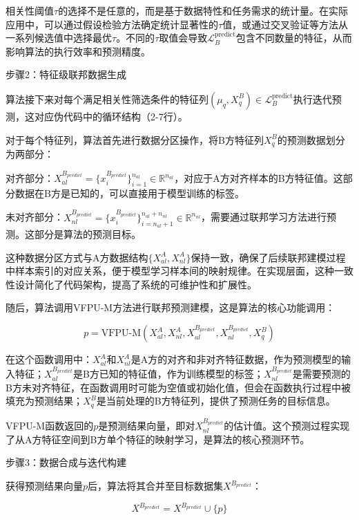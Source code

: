 相关性阈值$\tau$的选择不是任意的，而是基于数据特性和任务需求的统计量。在实际应用中，可以通过假设检验方法确定统计显著性的$\tau$值，或通过交叉验证等方法从一系列候选值中选择最优$\tau$。不同的$\tau$取值会导致$\mathcal{L}_B^{\text{predict}}$包含不同数量的特征，从而影响算法的执行效率和预测精度。

步骤2：特征级联邦数据生成

算法接下来对每个满足相关性筛选条件的特征列$(\mu_q, X^B_q) \in \mathcal{L}_B^{\text{predict}}$执行迭代预测，这对应伪代码中的循环结构（2-7行）。

对于每个特征列，算法首先进行数据分区操作，将B方特征列$X^B_q$的预测数据划分为两部分：

对齐部分：$X_{al}^{B_{predict}} = \{x_{i}^{B_{predict}}\}_{i=1}^{n_{al}} \in \mathbb{R}^{n_{al}}$，对应于A方对齐样本的B方特征值。这部分数据在B方是已知的，可以直接用于模型训练的标签。

未对齐部分：$X_{nl}^{B_{predict}} = \{x_{i}^{B_{predict}}\}_{i=n_{al}+1}^{n_{al}+n_{nl}} \in \mathbb{R}^{n_{nl}}$，需要通过联邦学习方法进行预测。这部分是算法的预测目标。

这种数据分区方式与A方数据结构$\{X_{al}^A, X_{nl}^A\}$保持一致，确保了后续联邦建模过程中样本索引的对应关系，便于模型学习样本间的映射规律。在实现层面，这种一致性设计简化了代码架构，提高了系统的可维护性和扩展性。

随后，算法调用VFPU-M方法进行联邦预测建模，这是算法的核心功能调用：

\begin{equation}
	p = \text{VFPU-M}(X_{al}^A, X_{nl}^A, X_{al}^{B_{predict}}, X_{nl}^{B_{predict}}, X^B_q)
\end{equation}

在这个函数调用中：$X_{al}^A$和$X_{nl}^A$是A方的对齐和非对齐特征数据，作为预测模型的输入特征；$X_{al}^{B_{predict}}$是B方已知的特征值，作为训练模型的标签；$X_{nl}^{B_{predict}}$是需要预测的B方未对齐特征，在函数调用时可能为空值或初始化值，但会在函数执行过程中被填充为预测结果；$X^B_q$是当前处理的B方特征列，提供了预测任务的目标信息。

VFPU-M函数返回的$p$是预测结果向量，即对$X_{nl}^{B_{predict}}$的估计值。这个预测过程实现了从A方特征空间到B方单个特征的映射学习，是算法的核心预测环节。

步骤3：数据合成与迭代构建

获得预测结果向量$p$后，算法将其合并至目标数据集$X^{B_{predict}}$：

\begin{equation}
	X^{B_{predict}} = X^{B_{predict}} \cup \{p\}
\end{equation}

